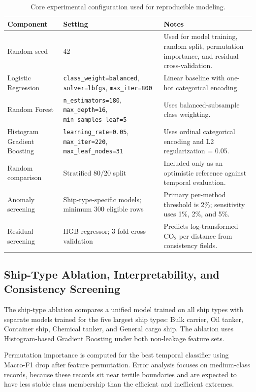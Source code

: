 \documentclass[preprints,article,submit,pdftex,oneauthor]{Definitions/mdpi}
\begin{document}
\begin{table}[H]
\caption{Core experimental configuration used for reproducible modeling.\label{tab:config}}
\begin{tabularx}{\textwidth}{LLX}
\toprule
\textbf{Component} & \textbf{Setting} & \textbf{Notes}\\
\midrule
Random seed & 42 & Used for model training, random split, permutation importance, and residual cross-validation.\\
Logistic Regression & \texttt{class\_weight=balanced}, \texttt{solver=lbfgs}, \texttt{max\_iter=800} & Linear baseline with one-hot categorical encoding.\\
Random Forest & \texttt{n\_estimators=180}, \texttt{max\_depth=16}, \texttt{min\_samples\_leaf=5} & Uses balanced-subsample class weighting.\\
Histogram Gradient Boosting & \texttt{learning\_rate=0.05}, \texttt{max\_iter=220}, \texttt{max\_leaf\_nodes=31} & Uses ordinal categorical encoding and L2 regularization = 0.05.\\
Random comparison & Stratified 80/20 split & Included only as an optimistic reference against temporal evaluation.\\
Anomaly screening & Ship-type-specific models; minimum 300 eligible rows & Primary per-method threshold is 2\%; sensitivity uses 1\%, 2\%, and 5\%.\\
Residual screening & HGB regressor; 3-fold cross-validation & Predicts log-transformed CO$_2$ per distance from consistency fields.\\
\bottomrule
\end{tabularx}
\end{table}

\subsection{Ship-Type Ablation, Interpretability, and Consistency Screening}

The ship-type ablation compares a unified model trained on all ship types with separate models trained for the five largest ship types: Bulk carrier, Oil tanker, Container ship, Chemical tanker, and General cargo ship. The ablation uses Histogram-based Gradient Boosting under both non-leakage feature sets.

Permutation importance is computed for the best temporal classifier using Macro-F1 drop after feature permutation. Error analysis focuses on medium-class records, because these records sit near tertile boundaries and are expected to have less stable class membership than the efficient and inefficient extremes.
\end{document}
